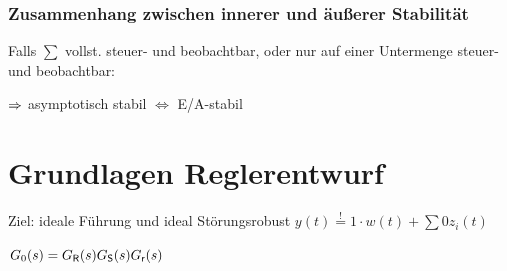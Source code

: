 \documentclass[fs, footer]{latex4ei}
\begin{document}
\begin{multicols*}{4}
{\subsubsection*{Zusammenhang zwischen innerer und äußerer Stabilität}

Falls $\sum$ vollst. steuer- und beobachtbar, oder nur auf einer Untermenge steuer- und beobachtbar:

$\Rightarrow$ asymptotisch stabil $\Leftrightarrow$ E/A-stabil
}




\section{Grundlagen Reglerentwurf}
Ziel: ideale Führung und ideal Störungsrobust $y(t) \stackrel{!}{=} 1 \cdot w(t) + \sum 0 z_i(t)$

$G_0(s) = G_{\sf R}(s) G_{\sf S}(s) G_{\sf r}(s)$



\end{multicols*}





\end{document}
